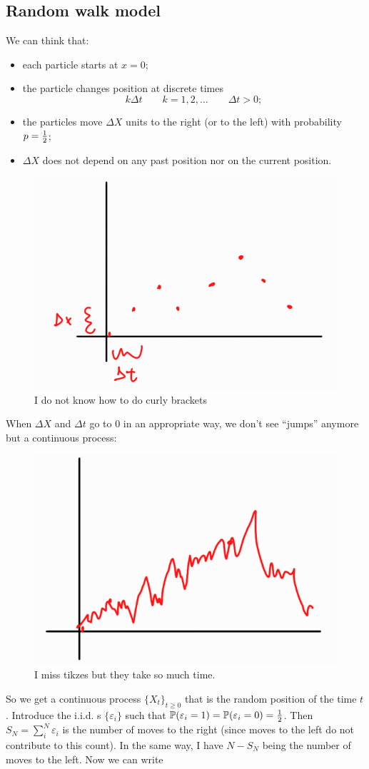 \documentclass[12pt]{report}
\begin{document}
\subsection{Random walk model}
We can think that:
\begin{itemize}
	\item each particle starts at $x=0$;
	\item the particle changes position at discrete times
	\begin{equation*}
		k\Delta t \qquad k=1,2,\ldots\qquad\Delta t>0;
	\end{equation*}
	\item the particles move $\Delta X$ units to the right (or to the left) with probability $p=\frac{1}{2}$;
	\item $\Delta X$ does not depend on any past position nor on the current position. 
\end{itemize}
\begin{figure}[h]
	\centering
	\includegraphics[width=0.5\linewidth]{img/screenshot008}
	\caption{I do not know how to do curly brackets}
	\label{fig:screenshot008}
\end{figure}
When $\Delta X$ and $\Delta t$ go to 0 in an appropriate way, we don't see ``jumps'' anymore but a continuous process:
\begin{figure}[h]
	\centering
	\includegraphics[width=0.5\linewidth]{img/screenshot009}
	\caption{I miss tikzes but they take so much time.}
	\label{fig:screenshot009}
\end{figure}
So we get a continuous process ${\{X_{t}\}}_{t\geq0}$ that is the random position of the time $t$. Introduce the i.i.d. \rv s $\{\varepsilon_{i}\}$ such that $\mathbb{P}(\varepsilon_{i}=1)=\mathbb{P}(\varepsilon_{i}=0)=\frac{1}{2}$. Then $S_{N}=\sum_{i}^{N}\varepsilon_{i}$ is the number of moves to the right (since moves to the left do not contribute to this count). In the same way, I have $N-S_{N}$ being the number of moves to the left. Now we can write
\end{document}
